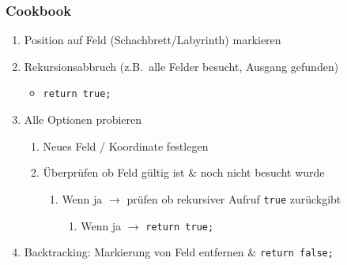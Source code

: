 \documentclass[a4paper, landscape, 8pt]{scrartcl}
\begin{document}
\begin{multicols*}{4}
                \subsubsection{Cookbook}
                    \begin{enumerate}
                        \item Position auf Feld (Schachbrett/Labyrinth) markieren
                        \item Rekursionsabbruch (z.B.\ alle Felder besucht, Ausgang gefunden)
                        \begin{itemize}
                            \item \texttt{return true;}
                        \end{itemize}
                        \item Alle Optionen probieren
                        \begin{enumerate}
                            \item Neues Feld / Koordinate festlegen
                            \item Überprüfen ob Feld gültig ist \& noch nicht besucht wurde
                            \begin{enumerate}
                                \item Wenn ja $\to$ prüfen ob rekursiver Aufruf \texttt{true} zurückgibt
                                \begin{enumerate}
                                    \item Wenn ja $\to$ \texttt{return true;}
                                \end{enumerate}
                            \end{enumerate}
                        \end{enumerate}
                        \item Backtracking: Markierung von Feld entfernen \& \texttt{return false;}
                    \end{enumerate}



\end{multicols*}
\end{document}
